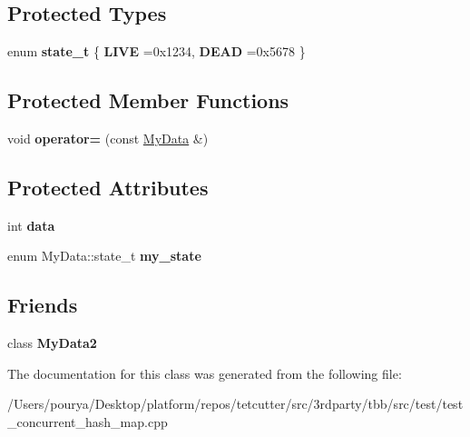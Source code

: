 \subsection*{Protected Types}
\begin{DoxyCompactItemize}
\item 
\hypertarget{classMyData_a5e157c5d8f043c9d1932d7580553d3bc}{}enum {\bfseries state\+\_\+t} \{ {\bfseries L\+I\+V\+E} =0x1234, 
{\bfseries D\+E\+A\+D} =0x5678
 \}\label{classMyData_a5e157c5d8f043c9d1932d7580553d3bc}

\end{DoxyCompactItemize}
\subsection*{Protected Member Functions}
\begin{DoxyCompactItemize}
\item 
\hypertarget{classMyData_a68ebe7fe314492cf1b8b542a95bcab29}{}void {\bfseries operator=} (const \hyperlink{classMyData}{My\+Data} \&)\label{classMyData_a68ebe7fe314492cf1b8b542a95bcab29}

\end{DoxyCompactItemize}
\subsection*{Protected Attributes}
\begin{DoxyCompactItemize}
\item 
\hypertarget{classMyData_ab0e049fc7f2d198bcfb41a21305b2cf9}{}int {\bfseries data}\label{classMyData_ab0e049fc7f2d198bcfb41a21305b2cf9}

\item 
\hypertarget{classMyData_a15689fdb400540fae701c687e0dec5fd}{}enum My\+Data\+::state\+\_\+t {\bfseries my\+\_\+state}\label{classMyData_a15689fdb400540fae701c687e0dec5fd}

\end{DoxyCompactItemize}
\subsection*{Friends}
\begin{DoxyCompactItemize}
\item 
\hypertarget{classMyData_a0ef3ba198e6ab7f7b9e231a928046209}{}class {\bfseries My\+Data2}\label{classMyData_a0ef3ba198e6ab7f7b9e231a928046209}

\end{DoxyCompactItemize}


The documentation for this class was generated from the following file\+:\begin{DoxyCompactItemize}
\item 
/\+Users/pourya/\+Desktop/platform/repos/tetcutter/src/3rdparty/tbb/src/test/test\+\_\+concurrent\+\_\+hash\+\_\+map.\+cpp\end{DoxyCompactItemize}
